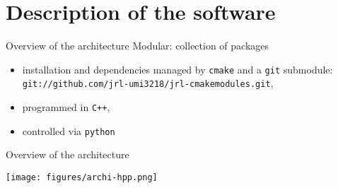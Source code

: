 \section {Description of the software}

%
%

\begin {frame} {Overview of the architecture}
  Modular: collection of packages
  \pause
  \begin{itemize}
    \item installation and dependencies managed by \texttt{cmake} and a \texttt{git}
      submodule: {\tiny\texttt{git://github.com/jrl-umi3218/jrl-cmakemodules.git}},
      \pause
    \item programmed in \texttt{C++},
      \pause
    \item controlled via \texttt{python}
  \end{itemize}
\end {frame}


%
%

\begin {frame} {Overview of the architecture}
\parbox {\linewidth} {
  \centerline {
    \texttt{[image: figures/archi-hpp.png]}
  }
}
\end {frame}

%
%

